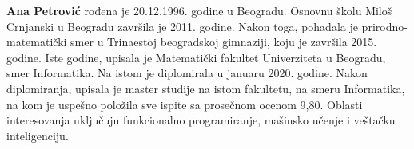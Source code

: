 \documentclass[12pt,oneside]{memoir}
\begin{document}
\literatura

\backmatter

\begin{biografija}
\textbf{Ana Petrović} rođena je 20.12.1996. godine u Beogradu. Osnovnu školu Miloš Crnjanski u Beogradu završila je 2011. godine. Nakon toga, pohađala je prirodno-matematički smer u Trinaestoj beogradskoj gimnaziji, koju je završila 2015. godine. Iste godine, upisala je Matematički fakultet Univerziteta u Beogradu, smer Informatika. Na istom je diplomirala u januaru 2020. godine. Nakon diplomiranja, upisala je master studije na istom fakultetu, na smeru Informatika, na kom je uspešno položila sve ispite sa prosečnom ocenom 9,80. Oblasti interesovanja uključuju funkcionalno programiranje, mašinsko učenje i veštačku inteligenciju.
\end{biografija}
\end{document}
